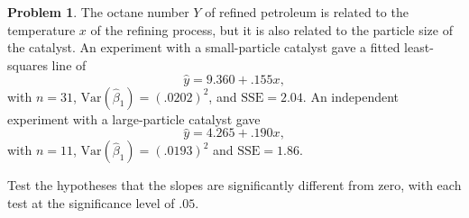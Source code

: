 \documentclass[10pt]{article}
\theoremstyle{definition}
\newtheorem{problem}[theorem]{Problem}
\newcommand{\1}[1]{\textbf{1}_{\left[#1\right]}} %
\def\Var{\mathrm{Var}} %
\begin{document}
\begin{problem}
  The octane number $Y$ of reﬁned petroleum is related to the temperature $x$ of
  the reﬁning process, but it is also related to the particle size of the
  catalyst. An experiment with a small-particle catalyst gave a ﬁtted
  least-squares line of
  \begin{equation*}
    \widehat{y} = 9.360 + .155x,
  \end{equation*}
  with $n=31$, $\Var(\widehat{\beta}_{1})= (.0202)^{2}$, and $\mathrm{SSE} =
  2.04$. An independent experiment with a large-particle catalyst gave
  \begin{equation*}
    \widehat{y}= 4.265 +.190x,
  \end{equation*}
  with $n=11$, $\Var(\widehat{\beta}_{1})= (.0193)^{2}$ and $\mathrm{SSE}
  =1.86$.

  Test the hypotheses that the slopes are significantly different from
  zero, with each test at the significance level of $.05$.
\end{problem}
\end{document}
